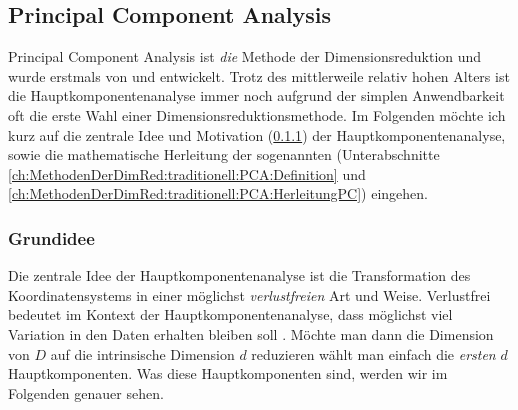 \subsection{Principal Component Analysis}
\label{ch:MethodenDerDimRed:traditionell:PCA}

Principal Component Analysis ist \textit{die} Methode der Dimensionsreduktion und wurde erstmals
von \textcite{Pearson.1901} und \textcite{Hotelling.1933} entwickelt. Trotz des mittlerweile
relativ hohen Alters ist die Hauptkomponentenanalyse immer noch aufgrund der simplen Anwendbarkeit
oft die erste Wahl einer Dimensionsreduktionsmethode. Im Folgenden möchte ich kurz auf die zentrale
Idee und Motivation (\ref{ch:MethodenDerDimRed:traditionell:PCA:Grundidee}) der
Hauptkomponentenanalyse, sowie die mathematische Herleitung der sogenannten
 (Unterabschnitte \ref{ch:MethodenDerDimRed:traditionell:PCA:Definition}
und \ref{ch:MethodenDerDimRed:traditionell:PCA:HerleitungPC}) eingehen.

\subsubsection{Grundidee}
\label{ch:MethodenDerDimRed:traditionell:PCA:Grundidee}
Die zentrale Idee der Hauptkomponentenanalyse ist die Transformation des Koordinatensystems in einer möglichst \textit{verlustfreien} Art und Weise. Verlustfrei bedeutet im Kontext der Hauptkomponentenanalyse, dass möglichst viel Variation in den Daten erhalten bleiben soll \parencite[vgl.][1]{Jolliffe.2002}. Möchte man dann die Dimension von $D$ auf die intrinsische
Dimension $d$ reduzieren wählt man einfach die \textit{ersten} $d$ Hauptkomponenten. Was diese
Hauptkomponenten sind, werden wir im Folgenden genauer sehen.

